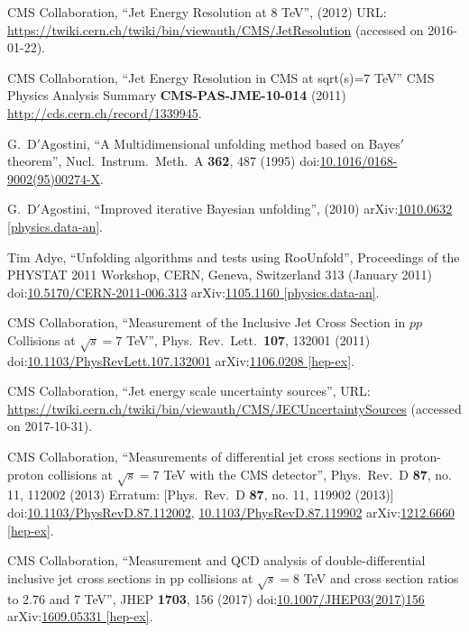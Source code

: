 \begin{thebibliography}{99}
CMS Collaboration, ``Jet Energy Resolution at 8 TeV'', (2012) URL: \url{https://twiki.cern.ch/twiki/bin/viewauth/CMS/JetResolution} (accessed on 2016-01-22).

CMS Collaboration, ``Jet Energy Resolution in CMS at sqrt(s)=7 TeV'' CMS Physics Analysis Summary {\bf CMS-PAS-JME-10-014} (2011) \url {http://cds.cern.ch/record/1339945}.

G.~D$'$Agostini, ``A Multidimensional unfolding method based on Bayes$'$ theorem'', Nucl.\ Instrum.\ Meth.\ A {\bf 362}, 487 (1995) doi:\href{http://dx.doi.org/10.1016/0168-9002(95)00274-X}{10.1016/0168-9002(95)00274-X}.

G.~D$'$Agostini, ``Improved iterative Bayesian unfolding'', (2010) arXiv:\href{https://arxiv.org/abs/1010.0632}{1010.0632 [physics.data-an]}.

Tim Adye, ``Unfolding algorithms and tests using RooUnfold'', Proceedings of the PHYSTAT 2011 Workshop, CERN, Geneva, Switzerland 313 (January 2011) doi:\href{http://dx.doi.org/10.5170/CERN-2011-006.313}{10.5170/CERN-2011-006.313} arXiv:\href{https://arxiv.org/abs/1105.1160}{1105.1160 [physics.data-an]}.

CMS Collaboration, ``Measurement of the Inclusive Jet Cross Section in $pp$ Collisions at $\sqrt{s}=7$ TeV'', Phys.\ Rev.\ Lett.\ {\bf 107}, 132001 (2011) doi:\href{https://doi.org/10.1103/PhysRevLett.107.132001}{10.1103/PhysRevLett.107.132001} arXiv:\href{https://arxiv.org/abs/1106.0208}{1106.0208 [hep-ex]}.

CMS Collaboration, ``Jet energy scale uncertainty sources'', URL: \url{https://twiki.cern.ch/twiki/bin/viewauth/CMS/JECUncertaintySources} (accessed on 2017-10-31).

CMS Collaboration, ``Measurements of differential jet cross sections in proton-proton collisions at $\sqrt{s}=7$ TeV with the CMS detector'', Phys.\ Rev.\ D {\bf 87}, no. 11, 112002 (2013) Erratum: [Phys.\ Rev.\ D {\bf 87}, no. 11, 119902 (2013)] doi:\href{http://dx.doi.org/10.1103/PhysRevD.87.112002}{10.1103/PhysRevD.87.112002}, \href{http://dx.doi.org/10.1103/PhysRevD.87.119902}{10.1103/PhysRevD.87.119902} arXiv:\href{https://arxiv.org/abs/1212.6660}{1212.6660 [hep-ex]}.

CMS Collaboration, ``Measurement and QCD analysis of double-differential inclusive jet cross sections in pp collisions at $ \sqrt{s}=8 $ TeV and cross section ratios to 2.76 and 7 TeV'', JHEP {\bf 1703}, 156 (2017) doi:\href{http://dx.doi.org/10.1007/JHEP03(2017)156}{10.1007/JHEP03(2017)156} arXiv:\href{https://arxiv.org/abs/1609.05331}{1609.05331 [hep-ex]}.


\end{thebibliography}
